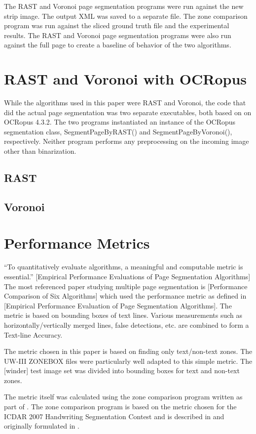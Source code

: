 \documentclass[conference]{IEEEtran}
\begin{document}
The RAST and Voronoi page segmentation programs were run against the new strip
image. The output XML was saved to a separate file. The zone comparison program
was run against the sliced ground truth file and the experimental results. The
RAST and Voronoi page segmentation programs were also run against the full page
to create a baseline of behavior of the two algorithms. 

\section{RAST and Voronoi with OCRopus}
While the algorithms used in this paper were RAST and Voronoi, the code that
did the actual page segmentation was two separate executables, both based on on
OCRopus 4.3.2. The two programs instantiated an instance of the OCRopus
segmentation class, SegmentPageByRAST() and SegmentPageByVoronoi(),
respectively. Neither program performs any preprocessing on the incoming image
other than binarization.

\subsection{RAST}

\subsection{Voronoi}

\section{Performance Metrics}
``To quantitatively evaluate algorithms, a meaningful and computable metric is
essential.'' [Empirical Performance Evaluations of Page Segmentation Algorithms]
The most referenced paper studying multiple page segmentation is [Performance
Comparison of Six Algorithms] which used the performance metric as defined in
[Empirical Performance Evaluation of Page Segmentation Algorithms]. The metric
is based on bounding boxes of text lines. Various measurements such as
horizontally/vertically merged lines, false detections, etc. are combined to
form a Text-line Accuracy.

The metric chosen in this paper is based on finding only text/non-text zones.
The UW-III ZONEBOX files were particularly well adapted to this simple
metric. The [winder] test image set was divided into bounding boxes for text
and non-text zones. 

The metric itself was calculated using the zone comparison program written as
part of \cite{IEEEhowto:Winder}. The zone comparison program is based on the
metric chosen for the ICDAR 2007 Handwriting Segmentation Contest and is
described in \cite{IEEEhowto:Gatos} and originally formulated in
\cite{IEEEhowto:Philips}. 
\end{document}
